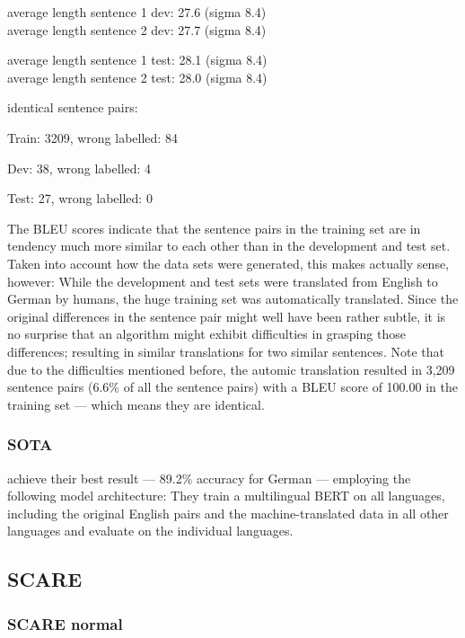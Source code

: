 average length sentence 1 dev: 27.6 (sigma 8.4) \\
average length sentence 2 dev: 27.7 (sigma 8.4)

average length sentence 1 test: 28.1 (sigma 8.4) \\
average length sentence 2 test: 28.0 (sigma 8.4)


identical sentence pairs:

Train: 3209, wrong labelled: 84

Dev: 38, wrong labelled: 4

Test: 27, wrong labelled: 0


The BLEU scores indicate that the sentence pairs in the training set are in tendency much
more similar to each other than in the development and test set. Taken into account how
the data sets were generated, this makes actually sense, however: While the development
and test sets were translated from English to German by humans, the huge training set was
automatically translated. Since the original differences in the sentence pair might well
have been rather subtle, it is no surprise that an algorithm might exhibit difficulties in
grasping those differences; resulting in similar translations for two similar sentences.
Note that due to the difficulties mentioned before, the automic translation resulted in
3,209 sentence pairs (6.6\% of all the sentence pairs) with a BLEU score of 100.00 in the
training set --- which means they are identical.


\subsubsection{SOTA}

\cite{yang2019paws} achieve their best result --- 89.2\% accuracy for German --- employing the
following model architecture:
They train a multilingual BERT on all languages, including the original English pairs and the
machine-translated data in all other languages and evaluate on the individual languages.

\subsection{SCARE}

\subsubsection{SCARE normal}

